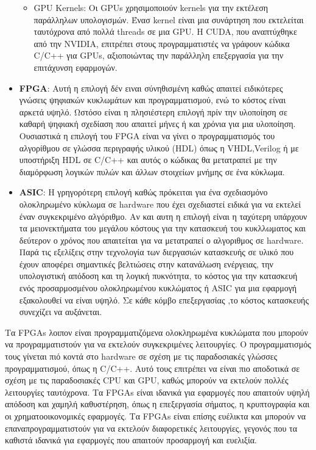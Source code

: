 \begin{itemize}
\begin{itemize}
            \item GPU Kernels: Οι GPUs χρησιμοποιούν kernels για την εκτέλεση παράλληλων υπολογισμών. 
            Ένασ kernel είναι μια συνάρτηση που εκτελείται ταυτόχρονα από πολλά threads σε μια GPU. 
            Η CUDA, που αναπτύχθηκε από την NVIDIA, επιτρέπει στους προγραμματιστές να γράφουν κώδικα C/C++ για GPUs, αξιοποιώντας την παράλληλη επεξεργασία για την επιτάχυνση εφαρμογών.
        \end{itemize}
    \item \textbf{FPGA}: Αυτή η επιλογή δέν ειναι σύνηθισμένη καθώς απαιτεί ειδικότερες γνώσεις ψηφιακών κυκλωμάτων και προγραμματισμού, ενώ το κόστος είναι αρκετά υψηλό.
    Ωστόσο είναι η πλησιέστερη επιλογή πρίν την υλοποίηση σε καθαρή ψηφιακή σχεδίαση που απαιτεί μήνες ή και χρόνια για μια υλοποίηση. Ουσιαστικά η επιλογή του FPGA είναι να 
    γίνει ο προγραμματισμός του αλγορίθμου σε γλώσσα περιγραφής υλικού (HDL) όπως η VHDL,Verilog ή με υποστήριξη HDL σε C/C++ και αυτός ο κώδικας θα μετατραπεί με την διαμόρφωση
    λογικών πυλών και άλλων στοιχείων μνήμης σε ένα κύκλωμα.
    \item \textbf{ASIC}: Η γρηγορότερη επιλογή καθώς πρόκειται για ένα σχεδιασμόνο ολοκληρωμένο κύκλωμα σε hardware που έχει σχεδιαστεί ειδικά για να εκτελεί έναν συγκεκριμένο αλγόριθμο.
    Αν και αυτη η επιλογή είναι η ταχύτερη υπάρχουν τα μειονεκτήματα του μεγάλου κόστους για την κατασκευή του κυκλλωματος και δεύτερον ο χρόνος που απαιτείται για να μετατραπεί ο αλγοριθμος σε hardware.
    Παρά τις εξελίξεις στην τεχνολογία των διεργασιών κατασκευής σε υλικό που έχουν αποφέρει σημαντικές βελτιώσεις
    στην κατανάλωση ενέργειας, την υπολογιστική απόδοση και τη λογική πυκνότητα, το κόστος
    για την κατασκευή ενός προσαρμοσμένου ολοκληρωμένου κυκλώματος ή ASIC για μια εφαρμογή εξακολουθεί να είναι υψηλό. Σε κάθε κόμβο επεξεργασίας
    ,το κόστος κατασκευής συνεχίζει να αυξάνεται.

\end{itemize}

Τα FPGAs λοιπον είναι προγραμματιζόμενα ολοκληρωμένα κυκλώματα που μπορούν να προγραμματιστούν για να εκτελούν συγκεκριμένες λειτουργίες.
Ο προγραμματισμός τους γίνεται πιό κοντά στο hardware σε σχέση με τις παραδοσιακές γλώσσες προγραμματισμού, όπως η C/C++.
Αυτό τους επιτρέπει να είναι πιο αποδοτικά σε σχέση με τις παραδοσιακές CPU και GPU, καθώς μπορούν να εκτελούν πολλές λειτουργίες ταυτόχρονα.
Τα FPGAs είναι ιδανικά για εφαρμογές που απαιτούν υψηλή απόδοση και χαμηλή καθυστέρηση, όπως η επεξεργασία σήματος, η κρυπτογραφία και οι χρηματοοικονομικές εφαρμογές.
Τα FPGAs είναι επίσης ευέλικτα και μπορούν να επαναπρογραμματιστούν για να εκτελούν διαφορετικές λειτουργίες, γεγονός που τα καθιστά ιδανικά για εφαρμογές που απαιτούν προσαρμογή και ευελιξία.

